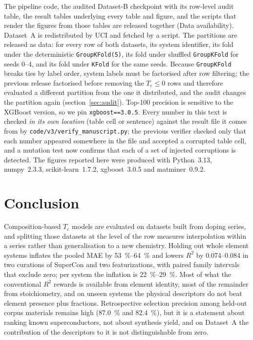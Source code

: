 \documentclass{iopjournal}
\newcommand{\Tc}{T_{\mathrm c}}
\newcommand{\Rsq}{R^{2}}
\begin{document}
The pipeline code, the audited Dataset-B checkpoint with its row-level audit table, the result
tables underlying every table and figure, and the scripts that render the figures from those
tables are released together (Data availability). Dataset~A is redistributed by UCI and fetched by a
script. The partitions are released as data: for every row of both datasets, its system identifier,
its fold under the deterministic \texttt{GroupKFold(5)}, its fold under shuffled \texttt{GroupKFold}
for seeds \numrange{0}{4}, and its fold under \texttt{KFold} for the same seeds. Because
\texttt{GroupKFold} breaks ties by label order, system labels must be factorised after row
filtering; the previous release factorised before removing the $\Tc \le 0$ rows and therefore
evaluated a different partition from the one it distributed, and the audit changes the partition
again (section~\ref{sec:audit}). Top-\num{100} precision is sensitive to the XGBoost version, so we
pin \texttt{xgboost==3.0.5}. Every number in this text is checked \emph{in its own location}
(table cell or sentence) against the result file it comes from by
\texttt{code/v3/verify\_manuscript.py}; the previous verifier checked only that each number appeared
somewhere in the file and accepted a corrupted table cell, and a mutation test now confirms that
each of a set of injected corruptions is detected. The figures reported here were produced with
Python~3.13, numpy~2.3.3, scikit-learn~1.7.2, xgboost~3.0.5 and matminer~0.9.2.

\section{Conclusion}

Composition-based $\Tc$ models are evaluated on datasets built from doping series, and splitting
those datasets at the level of the row measures interpolation within a series rather than
generalisation to a new chemistry. Holding out whole element systems inflates the pooled MAE by
\SIrange{53}{64}{\percent} and lowers $\Rsq$ by \numrange{0.074}{0.084} in two curations of
SuperCon and two featurizations, with paired family intervals that exclude zero; per system the
inflation is \SIrange{22}{29}{\percent}. Most of what the conventional $\Rsq$ rewards is available
from element identity, most of the remainder from stoichiometry, and on unseen systems the physical
descriptors do not beat element presence plus fractions. Retrospective selection precision among
held-out corpus materials remains high (\SI{87.0}{\percent} and \SI{82.4}{\percent}), but it is a
statement about ranking known superconductors, not about synthesis yield, and on Dataset~A the
contribution of the descriptors to it is not distinguishable from zero.
\end{document}
